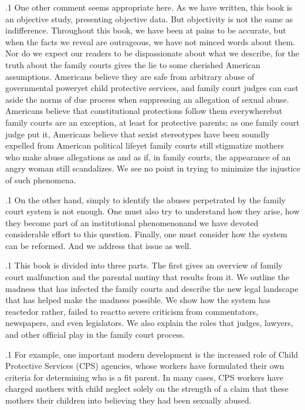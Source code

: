 \documentclass[11pt, twoside]{article}
\begin{document}
{\p.1{%
One other comment seems appropriate here. As we have written,
this book is an objective study, presenting objective data. But objectivity is not the same as indifference. Throughout this book, we have
been at pains to be accurate, but when the facts we reveal are outrageous, we have not minced words about them. Nor do we expect
our readers to be dispassionate about what we describe, for the truth
about the family courts gives the lie to some cherished American assumptions. Americans believe they are safe from arbitrary abuse of
governmental power\mdash{}yet child protective services, 
and family court judges can cast aside the norms of due process
when suppressing an allegation of sexual abuse. Americans believe
that constitutional protections follow them everywhere\mdash{}but family
courts are an exception, at least for protective parents; as
one family court judge put it, 
Americans believe that sexist stereotypes have been soundly expelled
from American political life\mdash{}yet family courts still stigmatize mothers
who make abuse allegations as   and 
as if, in family courts, the appearance of an angry woman still scandalizes. We see no point in trying to minimize the injustice of such
phenomena.
}%

\p.1{%
On the other hand, simply to identify the abuses perpetrated by the
family court system is not enough. One must also try to understand how
they arise, how they become part of an institutional phenomenon\mdash{}and
we have devoted considerable effort to this question. Finally, one must
consider how the system can be reformed. And we address that issue as
well.
}%

\p.1{%
This book is divided into three parts. The first gives an overview of
family court malfunction and the parental mutiny that results from it.
We outline the madness that has infected the family courts and describe
the new legal landscape that has helped make the madness possible. We
show how the system has reacted\mdash{}or rather, failed to react\mdash{}to severe
criticism from commentators, newspapers, and even legislators. We also
explain the roles that judges, lawyers, and other official  play
in the family court process.
}%

\p.1{%
For example, one important modern development is the increased
role of Child Protective Services (CPS) agencies, whose workers have
formulated their own criteria for determining who is a fit parent. In
many cases, CPS workers have charged mothers with child neglect
solely on the strength of a claim that these mothers  their
children into believing they had been sexually abused.
}%

}
\end{document}
